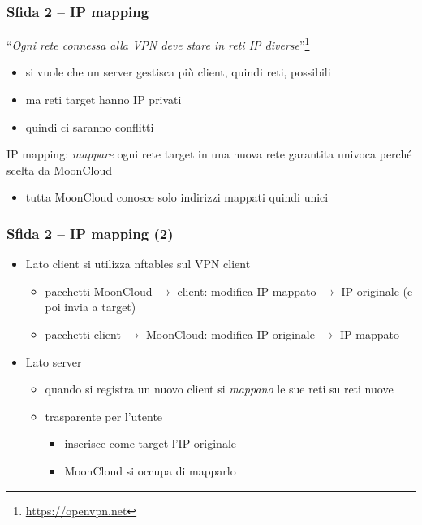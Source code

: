 \begin{frame}
    \frametitle{Sfida 2 -- IP mapping}
    ``\textit{Ogni rete connessa alla VPN deve stare in reti IP diverse}''\footnote{\url{https://openvpn.net}}
    \begin{itemize}
        \item<1-> si vuole che un server gestisca più client, quindi reti, possibili
        \item<2-> ma reti target hanno IP privati
        \item<3-> quindi ci saranno conflitti
    \end{itemize}

    \alert{IP mapping}: \textit{mappare} ogni rete target in una nuova rete
    \alert{garantita univoca} perché scelta da MoonCloud
    \begin{itemize}
        \item tutta MoonCloud conosce solo indirizzi mappati quindi unici
    \end{itemize}
\end{frame}

\begin{frame}
    \frametitle{Sfida 2 -- IP mapping (2)}
    \begin{itemize}
        \item \alert{Lato client} si utilizza \alert{nftables} sul VPN client
        \begin{itemize}
            \item pacchetti MoonCloud $\rightarrow$ client: modifica IP mappato $\rightarrow$ IP originale
            (e poi invia a target)
            \item pacchetti client $\rightarrow$ MoonCloud: modifica IP originale $\rightarrow$ IP mappato
        \end{itemize}
        \item \alert{Lato server}
        \begin{itemize}
            \item quando si registra un nuovo client si \textit{mappano} le sue reti su reti nuove
            \item \alert{trasparente} per l'utente
            \begin{itemize}
                \item inserisce come target l'IP originale
                \item MoonCloud si occupa di mapparlo
            \end{itemize}
        \end{itemize}
    \end{itemize}
\end{frame}

